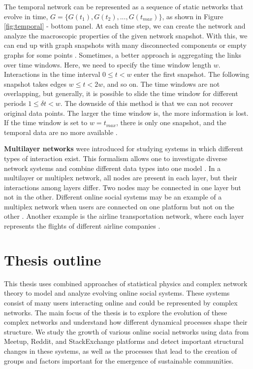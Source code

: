 The temporal network can be represented as a sequence of static networks that evolve in time, $G = \{ G(t_1), G(t_2), ..., G(t_{max})\}$, as shown in Figure \ref{fig:temporal} - bottom panel. At each time step, we can create the network and analyze the macroscopic properties of the given network snapshot. With this, we can end up with graph snapshots with many disconnected components or empty graphs for some points \cite{holme2015modern}. Sometimes, a better approach is aggregating the links over time windows. Here, we need to specify the time window length $w$. Interactions in the time interval $0\leq t<w$ enter the first snapshot. The following snapshot takes edges $w \leq t <2w$, and so on. The time windows are not overlapping, but generally, it is possible to slide the time window for different periods $ 1 \leq \delta t < w$. The downside of this method is that we can not recover original data points. The larger the time window is, the more information is lost. If the time window is set to $w=t_{max}$, there is only one snapshot, and the temporal data are no more available \cite{krings2012effects, arnold2021moving}. 

\textbf{Multilayer networks} were introduced for studying systems in which different types of interaction exist. This formalism allows one to investigate diverse network systems and combine different data types into one model \cite{porter2018multilayer}. In a multilayer or multiplex network, all nodes are present in each layer, but their interactions among layers differ. Two nodes may be connected in one layer but not in the other. Different online social systems may be an example of a multiplex network when users are connected on one platform but not on the other \cite{aleta2019multilayer}. Another example is the airline transportation network, where each layer represents the flights of different airline companies \cite{kivelamultilayer}.  


\section{Thesis outline}

This thesis uses combined approaches of statistical physics and complex network theory to model and analyze evolving online social systems. These systems consist of many users interacting online and could be represented by complex networks. The main focus of the thesis is to explore the evolution of these complex networks and understand how different dynamical processes shape their structure. We study the growth of various online social networks using data from Meetup, Reddit, and StackExchange platforms and detect important structural changes in these systems, as well as the processes that lead to the creation of groups and factors important for the emergence of sustainable communities.

